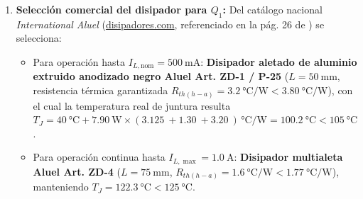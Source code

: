 \begin{enumerate}
    \item \textbf{Selección comercial del disipador para $Q_1$:} Del catálogo nacional \emph{International Aluel} (\url{disipadores.com}, referenciado en la pág. 26 de \cite{gonzalez_p2}) se selecciona:
    \begin{itemize}
        \item Para operación hasta $I_{L,\text{nom}} = \SI{500}{\milli\ampere}$: \textbf{Disipador aletado de aluminio extruido anodizado negro Aluel Art. ZD-1 / P-25} ($L = \SI{50}{\milli\meter}$, resistencia térmica garantizada $R_{th(h-a)} = \SI{3,2}{\celsius\per\watt} < \SI{3,80}{\celsius\per\watt}$), con el cual la temperatura real de juntura resulta $T_J = \SI{40}{\celsius} + \SI{7,90}{\watt} \times (\SI{3,125}{} + \SI{1,30}{} + \SI{3,20}{})\,\si{\celsius\per\watt} = \SI{100,2}{\celsius} < \SI{105}{\celsius}$.
        \item Para operación continua hasta $I_{L,\max} = \SI{1,0}{\ampere}$: \textbf{Disipador multialeta Aluel Art. ZD-4} ($L = \SI{75}{\milli\meter}$, $R_{th(h-a)} = \SI{1,6}{\celsius\per\watt} < \SI{1,77}{\celsius\per\watt}$), manteniendo $T_J = \SI{122,3}{\celsius} < \SI{125}{\celsius}$.
    \end{itemize}
\end{enumerate}

